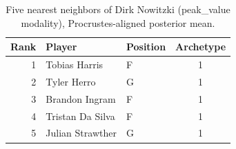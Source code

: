 \begin{table}[htbp]
  \centering\small
  \begin{tabular}{rllc}
    \toprule
    Rank & Player & Position & Archetype \\
    \midrule
    1 & Tobias Harris & F & 1 \\
    2 & Tyler Herro & G & 1 \\
    3 & Brandon Ingram & F & 1 \\
    4 & Tristan Da Silva & F & 1 \\
    5 & Julian Strawther & G & 1 \\
    \bottomrule
  \end{tabular}
  \caption{Five nearest neighbors of Dirk Nowitzki (peak_value modality), Procrustes-aligned posterior mean.}
  \label{tab:Dirk_Nowitzki_neighbors_peak_value}
\end{table}

